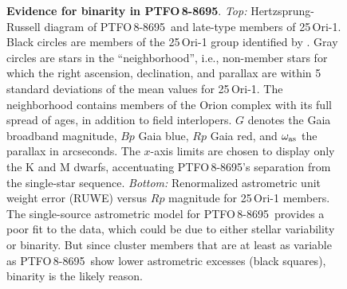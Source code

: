 \documentclass[12pt,twocolumn,tighten]{aastex62}
\newcommand{\ptfo}{PTFO$\,$8-8695}
\begin{document}
\begin{figure}[t]
	\begin{center}
		\leavevmode
		
		\vspace{-0.7cm}
	\end{center}
	\vspace{-0.7cm}
	\caption{ {\bf Evidence for binarity in \ptfo}.
    {\it Top:} Hertzsprung-Russell diagram of \ptfo\ and late-type
    members of 25$\,$Ori-1. Black circles are members of the
    25$\,$Ori-1 group identified by \citet{kounkel_apogee2_2018}.
    Gray circles are stars in the ``neighborhood'', i.e., non-member
    stars for which the right ascension, declination, and parallax are
    within 5 standard deviations of the mean values for 25$\,$Ori-1.
    The neighborhood contains members of the Orion complex with its
    full spread of ages, in addition to field interlopers.  $G$
    denotes the Gaia broadband magnitude, $Bp$ Gaia blue, $Rp$ Gaia
    red, and $\omega_{\rm as}$ the parallax in arcseconds.  The
    $x$-axis limits are chosen to display only the K and M dwarfs,
    accentuating \ptfo's separation from the single-star sequence.
    {\it Bottom:} Renormalized astrometric
    unit weight error (RUWE) versus $Rp$ magnitude
    for 25$\,$Ori-1 members.  The single-source astrometric model for
    \ptfo\ provides a poor fit to the data, which could be due to
    either stellar variability or binarity.  But since cluster members
    that are at least as variable as \ptfo\ show lower astrometric
    excesses (black squares), binarity is the likely reason.
		\label{fig:gaia}
	}
\end{figure}
\end{document}
